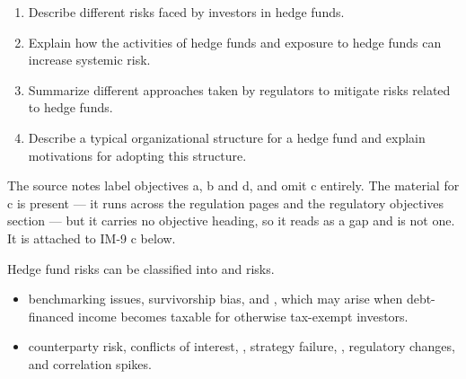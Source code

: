 

\begin{imkeybox}[title={The four objectives in this reading}]
\begin{enumerate}[label=\textbf{\alph*.}]
\item Describe different risks faced by investors in hedge funds.
\item Explain how the activities of hedge funds and exposure to hedge funds can increase systemic risk.
\item Summarize different approaches taken by regulators to mitigate risks related to hedge funds.
\item Describe a typical organizational structure for a hedge fund and explain motivations for adopting this structure.
\end{enumerate}
\end{imkeybox}

\begin{imtrapbox}[breakable=false,title={An objective with no label on it}]
The source notes label objectives a, b and d, and omit c entirely. The material
for c is present --- it runs across the regulation pages and the regulatory
objectives section --- but it carries no objective heading, so it reads as a gap
and is not one. It is attached to IM-9 c below.
\end{imtrapbox}


Hedge fund risks can be classified into  and
 risks.

\begin{itemize}
\item {} benchmarking issues, survivorship bias, and
, which may arise when
debt-financed income becomes taxable for otherwise tax-exempt investors.
\item {} counterparty risk, conflicts of interest,
, strategy failure, , regulatory changes,
and correlation spikes.
\end{itemize}

